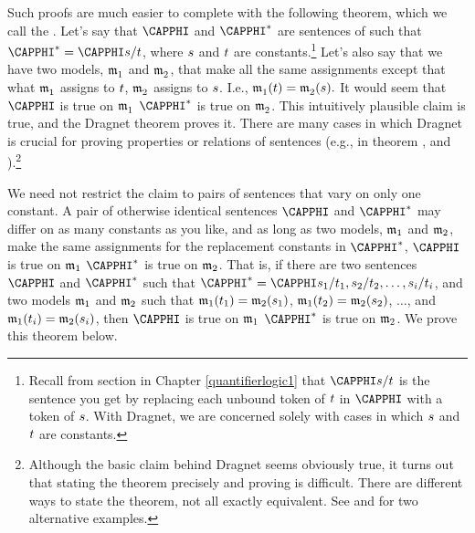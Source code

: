 Such proofs are much easier to complete with the following theorem, which we call the .  Let's say that $\CAPPHI$ and $\CAPPHI^*$ are sentences of \GQL{} such that $\CAPPHI^*=\CAPPHI\variable{s}/\variable{t}$, where $s$ and $t$ are constants.\footnote{Recall from section  in Chapter \ref{quantifierlogic1} that $\CAPPHI\variable{s}/\variable{t}$ is the sentence you get by replacing each unbound token of $t$ in $\CAPPHI$ with a token of $s$.  With Dragnet, we are concerned solely with cases in which $s$ and $t$ are constants.}  Let's also say that we have two models, $\mathfrak{m^{\mathrm{}}_{\mathrm{1}}}$ and $\mathfrak{m^{\mathrm{}}_{\mathrm{2}}}$, that make all the same assignments except that what $\mathfrak{m^{\mathrm{}}_{\mathrm{1}}}$ assigns to $t$, $\mathfrak{m^{\mathrm{}}_{\mathrm{2}}}$ assigns to $s$. I.e., $\mathfrak{m^{\mathrm{}}_{\mathrm{1}}}(t)=\mathfrak{m^{\mathrm{}}_{\mathrm{2}}}(s).$  It would seem that $\CAPPHI$ is true on $\mathfrak{m^{\mathrm{}}_{\mathrm{1}}}$ \Iff $\CAPPHI^*$ is true on $\mathfrak{m^{\mathrm{}}_{\mathrm{2}}}$.  This intuitively plausible claim is true, and the Dragnet theorem proves it.  There are many cases in which Dragnet is crucial for proving properties or relations of sentences (e.g., in theorem , and ).\footnote{Although the basic claim behind Dragnet seems obviously true, it turns out that stating the theorem precisely and proving is difficult. 
There are different ways to state the theorem, not all exactly equivalent. See \citealt[66]{Mates1972} and \citealt[577]{Bergmann2003} for two alternative examples.}

We need not restrict the claim to pairs of sentences that vary on only one constant.  A pair of otherwise identical sentences $\CAPPHI$ and $\CAPPHI^*$ may differ on as many constants as you like, and as long as two models, $\mathfrak{m}_1$ and $\mathfrak{m}_2$, make the same assignments for the replacement constants in $\CAPPHI^*$, $\CAPPHI$ is true on $\mathfrak{m}_1$ \Iff $\CAPPHI^*$ is true on $\mathfrak{m}_2$. 
That is, if there are two sentences $\CAPPHI$ and $\CAPPHI^*$ such that  $\CAPPHI^*=\CAPPHI\variable{s}_1/\variable{t}_1,\variable{s}_2/\variable{t}_2,\ldots,\variable{s}_{\integer{i}}/\variable{t}_{\integer{i}}$, and two models $\mathfrak{m}_1$ and $\mathfrak{m}_2$ such that $\mathfrak{m}_1(t_1)=\mathfrak{m}_2(s_1)$, $\mathfrak{m}_1(t_2)=\mathfrak{m}_2(s_2)$, $\ldots$, and $\mathfrak{m}_1(t_{i})=\mathfrak{m}_2(s_{i})$, then $\CAPPHI$ is true on $\mathfrak{m}_1$ \Iff $\CAPPHI^*$ is true on $\mathfrak{m}_2$.  We prove this theorem below.

